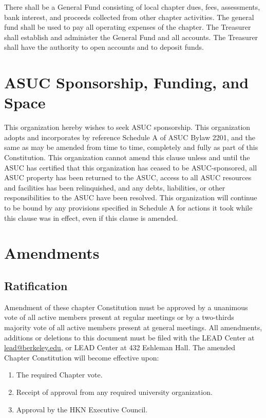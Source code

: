 \documentclass[11pt]{article}
\begin{document}
There shall be a General Fund consisting of local chapter dues, fees, assessments, bank interest, and proceeds collected from other chapter activities.
The general fund shall be used to pay all operating expenses of the chapter.
The Treasurer shall establish and administer the General Fund and all accounts.
The Treasurer shall have the authority to open accounts and to deposit funds.
\section{ASUC Sponsorship, Funding, and Space}
\label{sec:orge70c676}

This organization hereby wishes to seek ASUC sponsorship.
This organization adopts and incorporates by reference Schedule A of ASUC Bylaw 2201,  and the same as may be amended from time to time, completely and fully as part of this Constitution.
This organization cannot amend this clause unless and until the ASUC has certified that this organization has ceased to be ASUC-sponsored, all ASUC property has been returned to the ASUC, access to all ASUC resources and facilities has been relinquished, and any debts, liabilities, or other responsibilities to the ASUC have been resolved.
This organization will continue to be bound by any provisions specified in Schedule A for actions it took while this clause was in effect, even if this clause is amended.
\section{Amendments}
\label{sec:orga736c8c}

\subsection{Ratification}
\label{sec:org727d0f7}

Amendment of these chapter Constitution must be approved by a unanimous vote of all active members present at regular meetings or by a two-thirds majority vote of all active members present at general meetings.
All amendments, additions or deletions to this document must be filed with the LEAD Center at \href{mailto:lead@berkeley.edu}{lead@berkeley.edu}, or LEAD Center at 432 Eshleman Hall.
The amended Chapter Constitution will become effective upon:

\begin{enumerate}
\item The required Chapter vote.
\item Receipt of approval from any required university organization.
\item Approval by the HKN Executive Council.
\end{enumerate}
\end{document}
